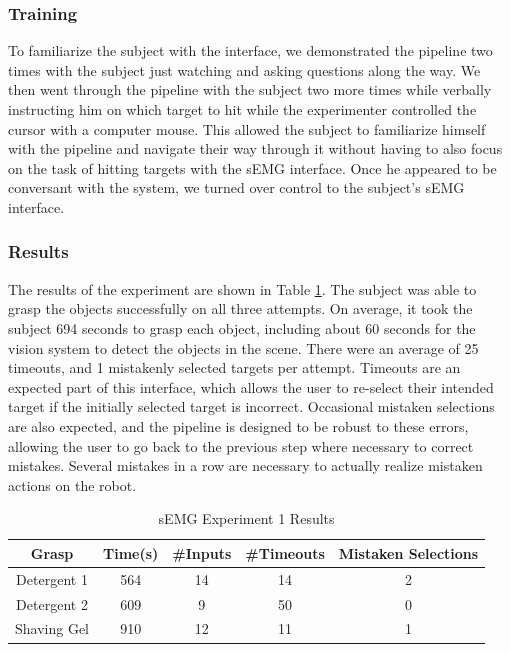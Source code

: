 \subsubsection{Training}
To familiarize the subject with the interface, we demonstrated the pipeline two times with the subject just watching and asking questions along the way. We then went through the pipeline with the subject two more times while verbally instructing him on which target to hit while the experimenter controlled the cursor with a computer mouse. This allowed the subject to familiarize himself with the pipeline and navigate their way through it without having to also focus on the task of hitting targets with the sEMG interface. Once he appeared to be conversant with the system, we turned over control to the subject's sEMG interface.

\subsubsection{Results}
The results of the experiment are shown in Table \ref{tab:semg_table_1}. The subject was able to grasp the objects successfully on all three attempts. On average, it took the subject 694 seconds to grasp each object, including about 60 seconds for the vision system to detect the objects in the scene. There were an average of 25 timeouts, and 1 mistakenly selected targets per attempt. Timeouts are an expected part of this interface, which allows the user to re-select their intended target if the initially selected target is incorrect. Occasional mistaken selections are also expected, and the pipeline is designed to be robust to these errors, allowing the user to go back to the previous step where necessary to correct mistakes. Several mistakes in a row are necessary to actually realize mistaken actions on the robot.


\begin{table}[ht!]
\centering
\begin{tabular}{|c|c|c|c|c|}
\hline
Grasp & Time(s) & \#Inputs & \#Timeouts & \begin{minipage}{.6in}\centering Mistaken Selections\end{minipage} \\ \hline
Detergent 1 & 564 & 14 & 14 & 2\\ \hline
Detergent 2 & 609 & 9 & 50 & 0\\ \hline
Shaving Gel & 910 & 12 & 11 & 1\\ \hline
\end{tabular}
\caption{sEMG Experiment 1 Results}
\label{tab:semg_table_1}
\end{table}

